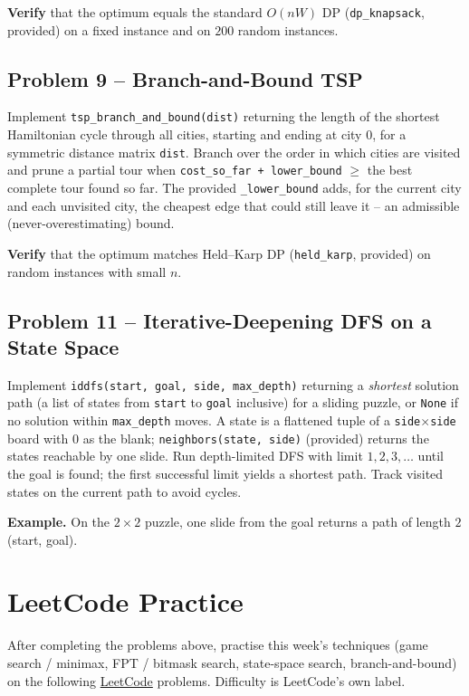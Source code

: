 \documentclass[11pt]{article}
\begin{document}
\textbf{Verify} that the optimum equals the standard $O(nW)$ DP
(\texttt{dp\_knapsack}, provided) on a fixed instance and on $200$ random
instances.

\subsection*{Problem 9 -- Branch-and-Bound TSP}

Implement \texttt{tsp\_branch\_and\_bound(dist)} returning the length of the
shortest Hamiltonian cycle through all cities, starting and ending at city $0$,
for a symmetric distance matrix \texttt{dist}. Branch over the order in which
cities are visited and prune a partial tour when \texttt{cost\_so\_far +
lower\_bound} $\ge$ the best complete tour found so far. The provided
\texttt{\_lower\_bound} adds, for the current city and each unvisited city, the
cheapest edge that could still leave it -- an admissible (never-overestimating)
bound.

\textbf{Verify} that the optimum matches Held--Karp DP (\texttt{held\_karp},
provided) on random instances with small $n$.

\subsection*{Problem 11 -- Iterative-Deepening DFS on a State Space}

Implement \texttt{iddfs(start, goal, side, max\_depth)} returning a
\emph{shortest} solution path (a list of states from \texttt{start} to
\texttt{goal} inclusive) for a sliding puzzle, or \texttt{None} if no solution
within \texttt{max\_depth} moves. A state is a flattened tuple of a
\texttt{side}$\times$\texttt{side} board with $0$ as the blank;
\texttt{neighbors(state, side)} (provided) returns the states reachable by one
slide. Run depth-limited DFS with limit $1, 2, 3, \dots$ until the goal is
found; the first successful limit yields a shortest path. Track visited states
on the current path to avoid cycles.

\textbf{Example.} On the $2\times2$ puzzle, one slide from the goal returns a
path of length $2$ (start, goal).

\newpage
\section{LeetCode Practice}

After completing the problems above, practise this week's techniques (game
search / minimax, FPT / bitmask search, state-space search, branch-and-bound) on
the following \href{https://leetcode.com}{LeetCode} problems. Difficulty is
LeetCode's own label.
\end{document}
